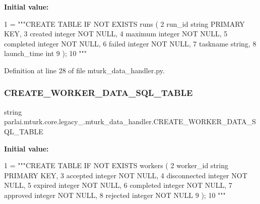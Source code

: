 {\bfseries Initial value\+:}
\begin{DoxyCode}
1 =  \textcolor{stringliteral}{"""CREATE TABLE IF NOT EXISTS runs (}
2 \textcolor{stringliteral}{        run\_id string PRIMARY KEY,}
3 \textcolor{stringliteral}{        created integer NOT NULL,}
4 \textcolor{stringliteral}{        maximum integer NOT NULL,}
5 \textcolor{stringliteral}{        completed integer NOT NULL,}
6 \textcolor{stringliteral}{        failed integer NOT NULL,}
7 \textcolor{stringliteral}{        taskname string,}
8 \textcolor{stringliteral}{        launch\_time int}
9 \textcolor{stringliteral}{    );}
10 \textcolor{stringliteral}{    """}
\end{DoxyCode}


Definition at line 28 of file mturk\+\_\+data\+\_\+handler.\+py.

\mbox{\label{namespaceparlai_1_1mturk_1_1core_1_1legacy__2018_1_1mturk__data__handler_aeb2918b96d3c8f22fccf25188fa2db7f}} 
\subsubsection{\texorpdfstring{C\+R\+E\+A\+T\+E\+\_\+\+W\+O\+R\+K\+E\+R\+\_\+\+D\+A\+T\+A\+\_\+\+S\+Q\+L\+\_\+\+T\+A\+B\+LE}{CREATE\_WORKER\_DATA\_SQL\_TABLE}}
{\footnotesize\ttfamily string parlai.\+mturk.\+core.\+legacy\+\_.\+mturk\+\_\+data\+\_\+handler.\+C\+R\+E\+A\+T\+E\+\_\+\+W\+O\+R\+K\+E\+R\+\_\+\+D\+A\+T\+A\+\_\+\+S\+Q\+L\+\_\+\+T\+A\+B\+LE}

{\bfseries Initial value\+:}
\begin{DoxyCode}
1 =  \textcolor{stringliteral}{"""CREATE TABLE IF NOT EXISTS workers (}
2 \textcolor{stringliteral}{        worker\_id string PRIMARY KEY,}
3 \textcolor{stringliteral}{        accepted integer NOT NULL,}
4 \textcolor{stringliteral}{        disconnected integer NOT NULL,}
5 \textcolor{stringliteral}{        expired integer NOT NULL,}
6 \textcolor{stringliteral}{        completed integer NOT NULL,}
7 \textcolor{stringliteral}{        approved integer NOT NULL,}
8 \textcolor{stringliteral}{        rejected integer NOT NULL}
9 \textcolor{stringliteral}{    );}
10 \textcolor{stringliteral}{    """}
\end{DoxyCode}



